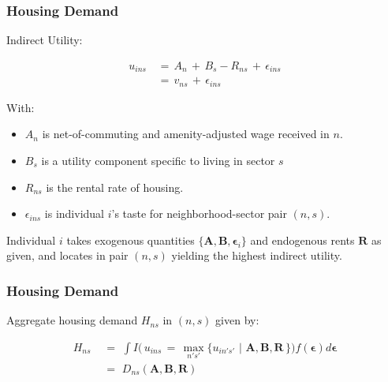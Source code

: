 \documentclass[aspectratio=149]{beamer}
\begin{document}

\begin{frame}
\frametitle{Housing Demand}

Indirect Utility:

\begin{equation*}
\begin{aligned}
u_{ins} \,& =\, A_n\,+\, B_s - R_{ns} \,+\, \epsilon_{ins} \\
        \,& =\, v_{ns} \,+\, \epsilon_{ins}
\end{aligned}
\end{equation*}

With:
\vspace{2mm}
\begin{itemize}
  \item $A_n$ is net-of-commuting and amenity-adjusted wage received in $n$.
  \item $B_s$ is a utility component specific to living in sector $s$
  \item $R_{ns}$ is the rental rate of housing.
  \item $\epsilon_{ins}$ is individual $i$'s taste for neighborhood-sector pair $(n,s)$.
\end{itemize}

\vspace{5mm}

Individual $i$ takes exogenous quantities $\{\bm{A},\bm{B},\bm{\epsilon}_i\}$ and endogenous rents $\bm{R}$ as given, and locates in pair $(n,s)$ yielding the highest indirect utility.


\end{frame}


\begin{frame}
\frametitle{Housing Demand}

Aggregate housing demand $H_{ns}$ in $(n,s)$ given by:

\begin{equation*}
\begin{aligned}
H_{ns} \,\,& =\,\, \int I\Big( \, u_{ins} \,=\, \max_{n's'}\{u_{in' s'} \,\,|\,\, \bm{A},\bm{B},\bm{R}\,\} \Big)f(\bm{\epsilon}) d\bm{\epsilon}    \\[.2em]
        \,\,& =\,\, D_{ns}(\bm{A},\bm{B},\bm{R})
\end{aligned}
\end{equation*}

\end{frame}
\end{document}

